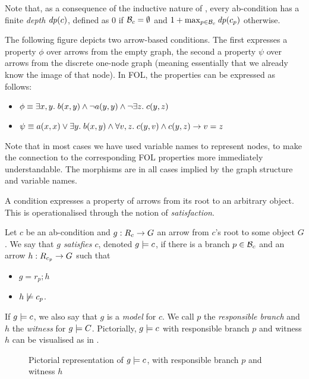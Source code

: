 Note that, as a consequence of the inductive nature of , every ab-condition has a finite \emph{depth} $\mathit{dp}(c)$, defined as $0$ if $\mathcal{B}_c=\emptyset$ and $1+\max_{p\in \mathcal{B}_c} \mathit{dp}(c_p)$ otherwise.

\begin{example}
The following figure depicts two arrow-based conditions. The first expresses a property $\phi$ over arrows from the empty graph, the second a property $\psi$ over arrows from the discrete one-node graph (meaning essentially that we already know the image of that node). In FOL, the properties can be expressed as follows:
\begin{itemize}
\item $\phi\equiv \exists x,y.\; b(x,y) \wedge \neg a(y,y)\wedge \neg \exists z.\; c(y,z)$
\item $\psi\equiv a(x,x)\vee \exists y.\; b(x,y) \wedge \forall v,z.\; c(y,v)\wedge c(y,z) \rightarrow v=z$
\end{itemize}
Note that in most cases we have used variable names to represent nodes, to make the connection to the corresponding FOL properties more immediately understandable. The morphisms are in all cases implied by the graph structure and variable names.
\begin{center}

\end{center}
\end{example}
%
A condition expresses a property of arrows from its root to an arbitrary object. This is operationalised through the notion of \emph{satisfaction}.

\begin{definition}
  Let $c$ be an ab-condition and $g:R_c\rightarrow G$ an arrow from $c$'s root to some object $G$. We say that \emph{$g$ satisfies $c$}, denoted $g\models c$, if there is a branch $p\in \mathcal{B}_c$ and an arrow $h:R_{c_p}\rightarrow G$ such that
  \begin{itemize}
  \item $g=r_p;h$
  \item $h\not\models c_p$.
  \end{itemize}
\end{definition}
%
If $g\models c$, we also say that $g$ is a \emph{model} for $c$. We call $p$ the \emph{responsible branch} and $h$ the \emph{witness} for $g\models C$. Pictorially, $g\models c$ with responsible branch $p$ and witness $h$ can be visualised as in .
%
\begin{figure}
  \centering
  
  \caption{Pictorial representation of $g\models c$, with responsible branch $p$ and witness $h$}
\end{figure}

